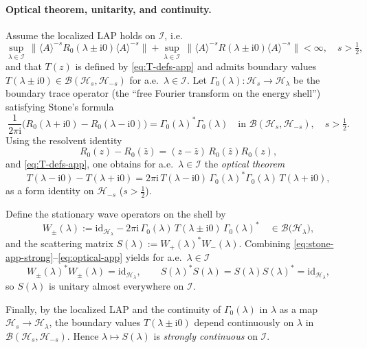 \documentclass[10pt]{amsart} %
\newcommand{\1}{{\mathbb{I}}}
\newcommand{\Bc}{\mathcal{B}}
\newcommand{\Hc}{\mathcal{H}}
\newcommand{\Ic}{\mathcal{I}}
\newcommand{\Hr}{\mathscr{H}}
\numberwithin{equation}{section}
\begin{document}
\paragraph{Optical theorem, unitarity, and continuity.}
Assume the localized LAP holds on $\Ic$, i.e.
\[
\sup_{\lambda\in\Ic}\,\big\|\langle A\rangle^{-s}R_0(\lambda\pm\mathrm i0)\langle A\rangle^{-s}\big\|
+\sup_{\lambda\in\Ic}\,\big\|\langle A\rangle^{-s}R(\lambda\pm\mathrm i0)\langle A\rangle^{-s}\big\|<\infty,
\quad s>\tfrac12,
\]
and that $T(z)$ is defined by \eqref{eq:T-defs-app} and admits boundary values
$T(\lambda\pm\mathrm i0)\in\Bc(\Hc_s,\Hc_{-s})$ for a.e.\ $\lambda\in\Ic$.
Let $\Gamma_0(\lambda):\Hc_s\to\Hr_\lambda$ be the boundary trace operator (the
``free Fourier transform on the energy shell'') satisfying Stone's formula
\begin{equation}\label{eq:stone-app-strong}
\frac1{2\pi\mathrm i}\big(R_0(\lambda+\mathrm i0)-R_0(\lambda-\mathrm i0)\big)
=\Gamma_0(\lambda)^*\Gamma_0(\lambda)
\quad \text{in }\Bc(\Hc_s,\Hc_{-s}),\quad s>\tfrac12.
\end{equation}
Using the resolvent identity
\[
R_0(z)-R_0(\bar z)=(z-\bar z)\,R_0(\bar z)R_0(z),
\]
and \eqref{eq:T-defs-app}, one obtains for a.e.\ $\lambda\in\Ic$ the \emph{optical theorem}
\begin{equation}\label{eq:optical-app}
T(\lambda-\mathrm i0)-T(\lambda+\mathrm i0)
=2\pi\mathrm i\,T(\lambda-\mathrm i0)\,\Gamma_0(\lambda)^*\Gamma_0(\lambda)\,T(\lambda+\mathrm i0),
\end{equation}
as a form identity on $\Hc_{-s}$ ($s>\tfrac12$).

Define the stationary wave operators on the shell by
\[
W_\pm(\lambda):=\mathrm{id}_{\Hr_\lambda}
-2\pi\mathrm i\,\Gamma_0(\lambda)\,T(\lambda\pm\mathrm i0)\,\Gamma_0(\lambda)^*
\quad\in\Bc\big(\Hr_\lambda\big),
\]
and the scattering matrix $S(\lambda):=W_+(\lambda)^*W_-(\lambda)$.
Combining \eqref{eq:stone-app-strong}--\eqref{eq:optical-app} yields for a.e.\ $\lambda\in\Ic$
\[
W_\pm(\lambda)^*W_\pm(\lambda)=\mathrm{id}_{\Hr_\lambda},
\qquad
S(\lambda)^*S(\lambda)=S(\lambda)S(\lambda)^*=\mathrm{id}_{\Hr_\lambda},
\]
so $S(\lambda)$ is unitary almost everywhere on $\Ic$.

Finally, by the localized LAP and the continuity of $\Gamma_0(\lambda)$ in $\lambda$ as a map
$\Hc_s\to\Hr_\lambda$, the boundary values $T(\lambda\pm\mathrm i0)$ depend
continuously on $\lambda$ in $\Bc(\Hc_s,\Hc_{-s})$. Hence $\lambda\mapsto S(\lambda)$ is
\emph{strongly continuous} on $\Ic$.
\end{document}
